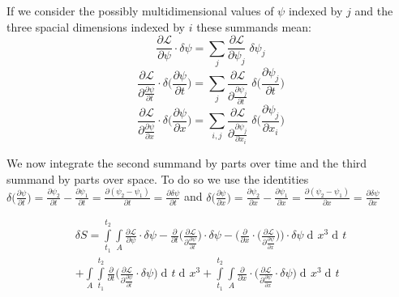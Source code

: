 \documentclass{article}
\DeclareMathOperator{\dd}{d\!}
\begin{document}
If we consider the possibly multidimensional values of $\psi$ indexed by $j$ and the three spacial dimensions indexed by $i$ these summands mean:
\begin{equation}
\frac{\partial \mathcal{L}}{\partial \psi} \cdot \delta \psi 
= \sum_{j} \frac{\partial \mathcal{L}}{\partial \psi_{j}} \; \delta \psi_{j} 
\end{equation}
\begin{equation}
\frac{\partial \mathcal{L}}{\partial \frac{\partial \psi}{\partial t}} \cdot \delta \bigg(\frac{\partial \psi} {\partial t}\bigg)
= \sum_{j} \frac{\partial \mathcal{L}}{\partial \frac{\partial \psi_{j}}{\partial t}} \; \delta \bigg(\frac{\partial \psi_{j}} {\partial t}\bigg)
\end{equation}
\begin{equation}
\frac{\partial \mathcal{L}}{\partial \frac{\partial \psi}{\partial x}} \cdot \delta \bigg(\frac{\partial \psi} {\partial x}\bigg)
= \sum_{i,j} \frac{\partial \mathcal{L}}{\partial \frac{\partial \psi_{j}}{\partial x_{i}}} \; \delta \bigg(\frac{\partial \psi_{j}} {\partial x_{i}}\bigg)
\end{equation}

We now integrate the second summand by parts over time and the third summand by parts over space. To do so we use the identities 
$\delta \bigg(\frac{\partial \psi} {\partial t}\bigg) 
= \frac{\partial \psi_2} {\partial t} - \frac{\partial \psi_1} {\partial t}
= \frac{\partial (\psi_2 - \psi_1)} {\partial t}
= \frac{\partial \delta \psi} {\partial t}$ 
and
$\delta \bigg(\frac{\partial \psi} {\partial x}\bigg) 
= \frac{\partial \psi_2} {\partial x} - \frac{\partial \psi_1} {\partial x}
= \frac{\partial (\psi_2 - \psi_1)} {\partial x}
= \frac{\partial \delta \psi} {\partial x}$ 

\begin{equation} \label{calcDeltaSSection2}
\begin{split}
\delta S = \int\limits_{t_1}^{t_2} \int\limits_{A} 
\frac{\partial \mathcal{L}}{\partial \psi} \cdot \delta \psi
-\frac{\partial}{\partial t} \bigg( \frac{\partial \mathcal{L}}{\partial \frac{\partial \psi}{\partial t}} \bigg) \cdot \delta \psi
-\bigg(\frac{\partial}{\partial x} \cdot \bigg( \frac{\partial \mathcal{L}}{\partial \frac{\partial \psi}{\partial x}} \bigg)\bigg) \cdot \delta \psi
\dd x^3 \dd t \\
+ \int\limits_{A} \int\limits_{t_1}^{t_2} \frac{\partial}{\partial t} \bigg(\frac{\partial \mathcal{L}}{\partial \frac{\partial \psi}{\partial t}} \cdot \delta \psi \bigg) \dd t \dd x^3
+ \int\limits_{t_1}^{t_2} 
\int\limits_{A} \frac{\partial}{\partial x} \cdot \bigg( \frac{\partial \mathcal{L}}{\partial \frac{\partial \psi}{\partial x}} \cdot \delta \psi \bigg) \dd x^3  \dd t
\end{split}
\end{equation}
\end{document}
